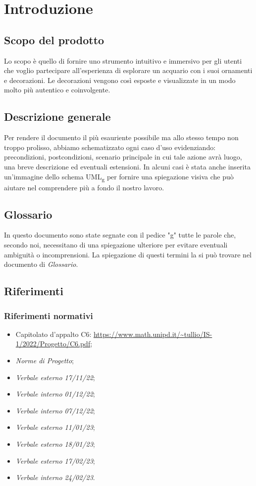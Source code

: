 \section{Introduzione}
\subsection{Scopo del prodotto}
Lo scopo è quello di fornire uno strumento intuitivo e immersivo per gli utenti che voglio partecipare all'esperienza di esplorare un acquario con i suoi ornamenti e decorazioni.
\newline
Le decorazioni vengono così esposte e visualizzate in un modo molto più autentico e coinvolgente.

\subsection{Descrizione generale}
Per rendere il documento il più esauriente possibile ma allo stesso tempo non troppo prolisso, abbiamo schematizzato ogni caso d'uso evidenziando:  precondizioni, postcondizioni, scenario principale in cui tale azione avrà luogo, una breve descrizione ed eventuali estensioni.\newline
In alcuni casi è stata anche inserita un'immagine dello schema UML\textsubscript{g} per fornire una spiegazione visiva che può aiutare nel comprendere più a fondo il nostro lavoro.\newline

\subsection{Glossario}
In questo documento sono state segnate con il pedice "g" tutte le parole che, secondo noi, necessitano di una spiegazione ulteriore per evitare eventuali ambiguità o incomprensioni. La spiegazione di questi termini la si può trovare nel documento di \textit{Glossario}.

\subsection{Riferimenti}
\subsubsection{Riferimenti normativi}
\begin{itemize}
\item Capitolato d’appalto C6: \url{https://www.math.unipd.it/~tullio/IS-1/2022/Progetto/C6.pdf};
\item \textit{Norme di Progetto};
\item \textit{Verbale esterno 17/11/22};
\item \textit{Verbale interno 01/12/22};
\item \textit{Verbale interno 07/12/22};
\item \textit{Verbale esterno 11/01/23};
\item \textit{Verbale esterno 18/01/23};
\item \textit{Verbale esterno 17/02/23};
\item \textit{Verbale interno 24/02/23}.
\end{itemize}

